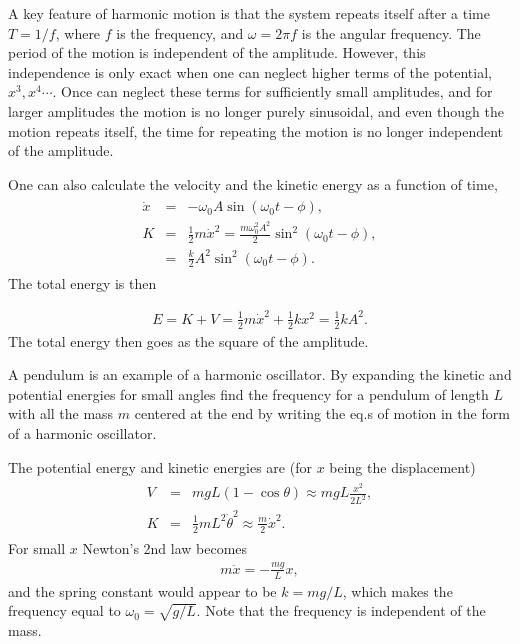 \documentclass[letterpaper,10pt,english]{sphinxmanual}
\begin{document}
A key feature of harmonic motion is that the system repeats itself
after a time \(T=1/f\), where \(f\) is the frequency, and \(\omega=2\pi f\)
is the angular frequency. The period of the motion is independent of
the amplitude. However, this independence is only exact when one can
neglect higher terms of the potential, \(x^3, x^4\cdots\). Once can
neglect these terms for sufficiently small amplitudes, and for larger
amplitudes the motion is no longer purely sinusoidal, and even though
the motion repeats itself, the time for repeating the motion is no
longer independent of the amplitude.

One can also calculate the velocity and the kinetic energy as a function of time,
\begin{equation*}
\begin{split}
\begin{eqnarray}
\dot{x}&=&-\omega_0A\sin(\omega_0 t-\phi),\\
\nonumber
K&=&\frac{1}{2}m\dot{x}^2=\frac{m\omega_0^2A^2}{2}\sin^2(\omega_0t-\phi),\\
\nonumber
&=&\frac{k}{2}A^2\sin^2(\omega_0t-\phi).
\end{eqnarray}
\end{split}
\end{equation*}
The total energy is then




\begin{equation*}
\begin{split}
\begin{equation}
E=K+V=\frac{1}{2}m\dot{x}^2+\frac{1}{2}kx^2=\frac{1}{2}kA^2.
\label{_auto2} \tag{2}
\end{equation}
\end{split}
\end{equation*}
The total energy then goes as the square of the amplitude.

A pendulum is an example of a harmonic oscillator. By expanding the
kinetic and potential energies for small angles find the frequency for
a pendulum of length \(L\) with all the mass \(m\) centered at the end by
writing the eq.s of motion in the form of a harmonic oscillator.

The potential energy and kinetic energies are (for \(x\) being the displacement)
\begin{equation*}
\begin{split}
\begin{eqnarray*}
V&=&mgL(1-\cos\theta)\approx mgL\frac{x^2}{2L^2},\\
K&=&\frac{1}{2}mL^2\dot{\theta}^2\approx \frac{m}{2}\dot{x}^2.
\end{eqnarray*}
\end{split}
\end{equation*}
For small \(x\) Newton’s 2nd law becomes
\begin{equation*}
\begin{split}
m\ddot{x}=-\frac{mg}{L}x,
\end{split}
\end{equation*}
and the spring constant would appear to be \(k=mg/L\), which makes the
frequency equal to \(\omega_0=\sqrt{g/L}\). Note that the frequency is
independent of the mass.
\end{document}
